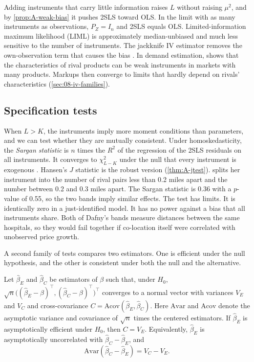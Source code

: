 Adding instruments that carry little information raises $L$ without raising $\mu^2$, and by
\cref{prop:A-weak-bias} it pushes 2SLS toward OLS. In the limit with as many instruments as observations,
$P_Z = I_n$ and 2SLS equals OLS. Limited-information maximum likelihood (LIML) is approximately median-unbiased
and much less sensitive to the number of instruments. The jackknife IV estimator removes the own-observation
term that causes the bias \citep{AngristImbensKrueger1999}. In demand estimation, \citet{Armstrong2016} shows
that the characteristics of rival products can be weak instruments in markets with many products. Markups then
converge to limits that hardly depend on rivals' characteristics (\cref{sec:08-iv-families}).

\subsection{Specification tests}\label{sec:A-spectests}

When $L > K$, the instruments imply more moment conditions than parameters, and we can test whether they are
mutually consistent. Under homoskedasticity, the \emph{Sargan statistic} is $n$ times the $R^2$ of the
regression of the 2SLS residuals on all instruments. It converges to $\chi^2_{L - K}$ under the null that every
instrument is exogenous \citep{Sargan1958}. Hansen's $J$ statistic is the robust version
(\cref{thm:A-jtest}). \citet[pp.~23--24]{Dafny2005} splits her instrument into the number of rival pairs less than
0.2 miles apart and the number between 0.2 and 0.3 miles apart. The Sargan statistic is 0.36 with a $p$-value
of 0.55, so the two bands imply similar effects. The test has limits. It is identically zero in a
just-identified model. It has no power against a bias that all instruments share. Both of Dafny's bands
measure distances between the same hospitals, so they would fail together if co-location itself were
correlated with unobserved price growth.

A second family of tests compares two estimators. One is efficient under the null hypothesis, and the other
is consistent under both the null and the alternative.

\begin{lemma}[Hausman]\label{lem:A-hausman}
Let $\hat\beta_E$ and $\hat\beta_C$ be estimators of $\beta$ such that, under $H_0$,
$\sqrt{n}\bigl((\hat\beta_E - \beta)^\top, (\hat\beta_C - \beta)^\top\bigr)^\top$ converges to a normal vector with
variances $V_E$ and $V_C$ and cross-covariance $C = \mathrm{Acov}(\hat\beta_E, \hat\beta_C)$. Here $\mathrm{Avar}$
and $\mathrm{Acov}$ denote the asymptotic variance and covariance of $\sqrt{n}$ times the centered estimators. If $\hat\beta_E$ is
asymptotically efficient under $H_0$, then $C = V_E$. Equivalently, $\hat\beta_E$ is asymptotically uncorrelated
with $\hat\beta_C - \hat\beta_E$, and
\begin{equation}\label{eq:A-hausman-var}
\mathrm{Avar}(\hat\beta_C - \hat\beta_E) = V_C - V_E .
\end{equation}
\end{lemma}

